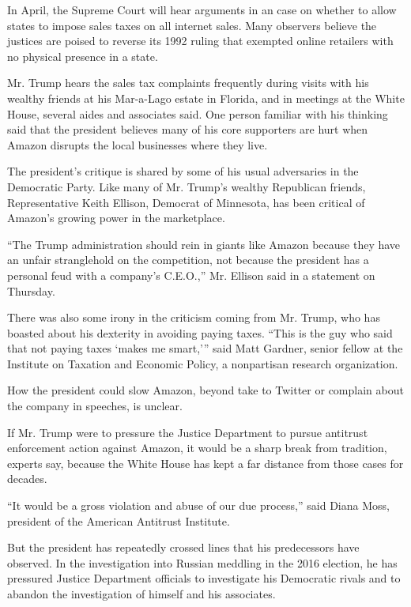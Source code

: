 In April, the Supreme Court will hear arguments in an case on whether to
allow states to impose sales taxes on all internet sales. Many observers
believe the justices are poised to reverse its 1992 ruling that exempted
online retailers with no physical presence in a state.

Mr. Trump hears the sales tax complaints frequently during visits with
his wealthy friends at his Mar-a-Lago estate in Florida, and in meetings
at the White House, several aides and associates said. One person
familiar with his thinking said that the president believes many of his
core supporters are hurt when Amazon disrupts the local businesses where
they live.

The president's critique is shared by some of his usual adversaries in
the Democratic Party. Like many of Mr. Trump's wealthy Republican
friends, Representative Keith Ellison, Democrat of Minnesota, has been
critical of Amazon's growing power in the marketplace.

``The Trump administration should rein in giants like Amazon because
they have an unfair stranglehold on the competition, not because the
president has a personal feud with a company's C.E.O.,'' Mr. Ellison
said in a statement on Thursday.

There was also some irony in the criticism coming from Mr. Trump, who
has boasted about his dexterity in avoiding paying taxes. ``This is the
guy who said that not paying taxes `makes me smart,''' said Matt
Gardner, senior fellow at the Institute on Taxation and Economic Policy,
a nonpartisan research organization.

How the president could slow Amazon, beyond take to Twitter or complain
about the company in speeches, is unclear.

If Mr. Trump were to pressure the Justice Department to pursue antitrust
enforcement action against Amazon, it would be a sharp break from
tradition, experts say, because the White House has kept a far distance
from those cases for decades.

``It would be a gross violation and abuse of our due process,'' said
Diana Moss, president of the American Antitrust Institute.

But the president has repeatedly crossed lines that his predecessors
have observed. In the investigation into Russian meddling in the 2016
election, he has pressured Justice Department officials to investigate
his Democratic rivals and to abandon the investigation of himself and
his associates.

